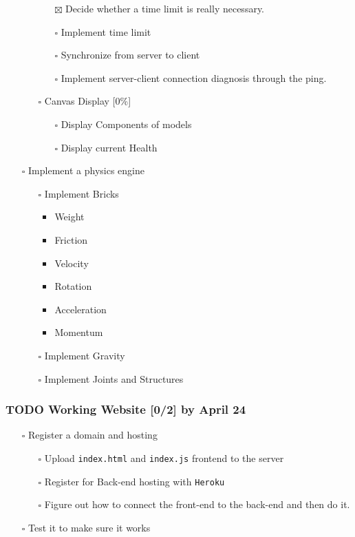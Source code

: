 \documentclass[11pt]{article}
\begin{document}
\begin{itemize}
\begin{itemize}
\begin{itemize}
\item[{$\boxtimes$}] Decide whether a time limit is really necessary.
\item[{$\square$}] Implement time limit
\item[{$\square$}] Synchronize from server to client
\item[{$\square$}] Implement server-client connection diagnosis through the ping.
\end{itemize}
\item[{$\square$}] Canvas Display [0\%]
\begin{itemize}
\item[{$\square$}] Display Components of models
\item[{$\square$}] Display current Health
\end{itemize}
\end{itemize}
\item[{$\square$}] Implement a physics engine
\begin{itemize}
\item[{$\square$}] Implement Bricks
\begin{itemize}
\item Weight
\item Friction
\item Velocity
\item Rotation
\item Acceleration
\item Momentum
\end{itemize}
\item[{$\square$}] Implement Gravity
\item[{$\square$}] Implement Joints and Structures
\end{itemize}
\end{itemize}
\subsubsection{{\bfseries\sffamily TODO} Working Website [0/2] by April 24}
\label{sec:orgebbd741}
\begin{itemize}
\item[{$\square$}] Register a domain and hosting
\begin{itemize}
\item[{$\square$}] Upload \texttt{index.html} and \texttt{index.js} frontend to the server
\item[{$\square$}] Register for Back-end hosting with \texttt{Heroku}
\item[{$\square$}] Figure out how to connect the front-end to the back-end and then do it.
\end{itemize}
\item[{$\square$}] Test it to make sure it works
\end{itemize}
\end{document}
